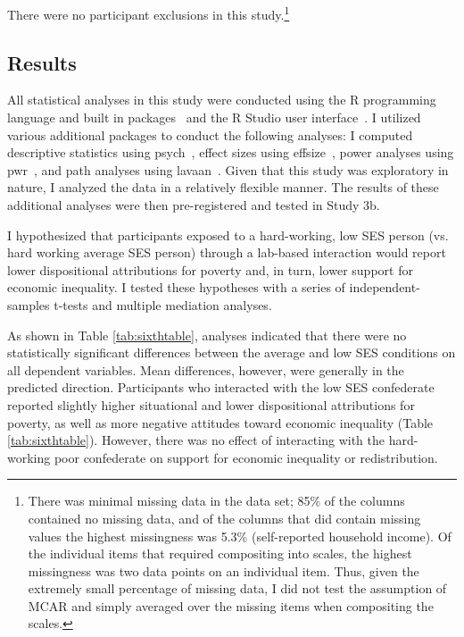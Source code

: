 \documentclass{sfuthesis}
\begin{document}
There were no participant exclusions in this study.\footnote{There was minimal missing data in the data set; 85\% of the columns contained no missing data, and of the columns that did contain missing values the highest missingness was 5.3\% (self-reported household income). Of the individual items that required compositing into scales, the highest missingness was two data points on an individual item. Thus, given the extremely small percentage of missing data, I did not test the assumption of MCAR and simply averaged over the missing items when compositing the scales.}

\subsection{Results}

All statistical analyses in this study were conducted using the R programming language and built in packages~\cite{rcore} and the R Studio user interface~\cite{rstudio16}. I utilized various additional packages to conduct the following analyses: I computed descriptive statistics using psych~\cite{revelle17}, effect sizes using effsize~\cite{torchiano17}, power analyses using pwr~\cite{champely18}, and path analyses using lavaan~\cite{rosseel12}. Given that this study was exploratory in nature, I analyzed the data in a relatively flexible manner. The results of these additional analyses were then pre-registered and tested in Study 3b. 

I hypothesized that participants exposed to a hard-working, low SES person (vs. hard working average SES person) through a lab-based interaction would report lower dispositional attributions for poverty and, in turn, lower support for economic inequality. I tested these hypotheses with a series of independent-samples t-tests and multiple mediation analyses.

As shown in Table \ref{tab:sixthtable}, analyses indicated that there were no statistically significant differences between the average and low SES conditions on all dependent variables. Mean differences, however, were generally in the predicted direction. Participants who interacted with the low SES confederate reported slightly higher situational and lower dispositional attributions for poverty, as well as more negative attitudes toward economic inequality (Table \ref{tab:sixthtable}). However, there was no effect of interacting with the hard-working poor confederate on support for economic inequality or redistribution. 
\end{document}
